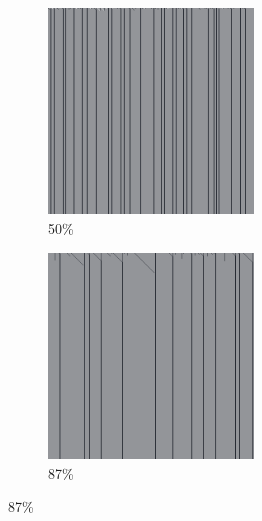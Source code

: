 \documentclass[12pt, fleqn]{report}                             %
\theoremstyle{break}                                            %
\begin{document}
\begin{figure}[ht!]
\begin{subfigure}[b]{0.4\linewidth}
          \includegraphics[width=0.6\textwidth]{Images/13/c.png}
          \caption{50\%}
        \end{subfigure}
        \begin{subfigure}[b]{0.4\linewidth}
          \includegraphics[width=0.6\textwidth]{Images/13/d.png}
          \caption{87\%}
        \end{subfigure}
      \end{figure}
\end{document}
